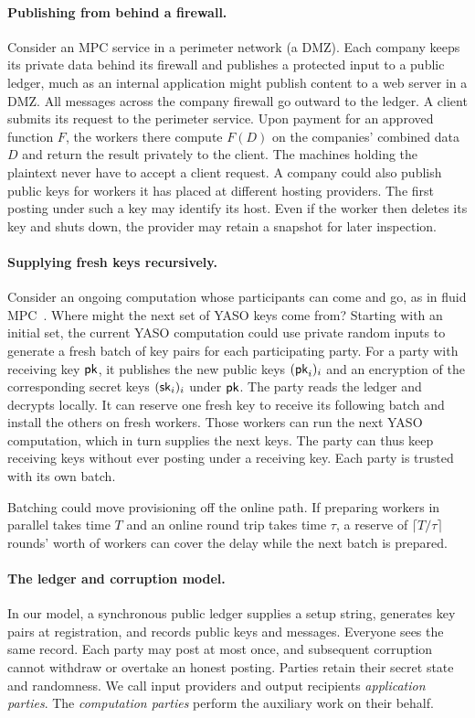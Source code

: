 \paragraph{Publishing from behind a firewall.}
Consider an MPC service in a perimeter network (a DMZ).  Each company
keeps its private data behind its firewall and publishes a protected
input to a public ledger, much as an internal application might publish
content to a web server in a DMZ.  All messages across the company
firewall go outward to the ledger.  A client submits its request to
the perimeter service.  Upon payment for an approved function $F$, the
workers there compute $F(D)$ on the companies' combined data $D$ and
return the result privately to the client.  The machines holding the
plaintext never have to accept a client request.  A company could also
publish public keys for workers it has placed at different hosting
providers.  The first posting under such a key may identify its host.
Even if the worker then deletes its key and shuts down, the provider
may retain a snapshot for later inspection.

\paragraph{Supplying fresh keys recursively.}
Consider an ongoing computation whose participants can come and go,
as in fluid MPC~\cite{ChoudhuriEtAl2021FluidMPC}.  Where might the
next set of YASO keys come from?  Starting with an initial set, the
current YASO computation could use private random inputs to generate
a fresh batch of key pairs for each participating party.  For a party
with receiving key $\mathsf{pk}$, it publishes the new public keys
$(\mathsf{pk}_i)_i$ and an encryption of the corresponding secret keys
$(\mathsf{sk}_i)_i$ under $\mathsf{pk}$.  The party reads the ledger and decrypts
locally.  It can reserve one fresh key to receive its following batch
and install the others on fresh workers.  Those workers can run the
next YASO computation, which in turn supplies the next keys.  The
party can thus keep receiving keys without ever posting under a
receiving key.  Each party is trusted with its own batch.

Batching could move provisioning off the online path.  If preparing
workers in parallel takes time $T$ and an online round trip takes time
$\tau$, a reserve of $\lceil T/\tau\rceil$ rounds' worth of workers
can cover the delay while the next batch is prepared.

\paragraph{The ledger and corruption model.}
In our model, a synchronous public ledger supplies a setup string, generates
key pairs at registration, and records public keys and messages.  Everyone sees the same
record.  Each party may post at most once, and subsequent corruption
cannot withdraw or overtake an honest posting.  Parties retain their
secret state and randomness.
We call input providers and output recipients \emph{application parties}.
The \emph{computation parties} perform the auxiliary work on their behalf.

